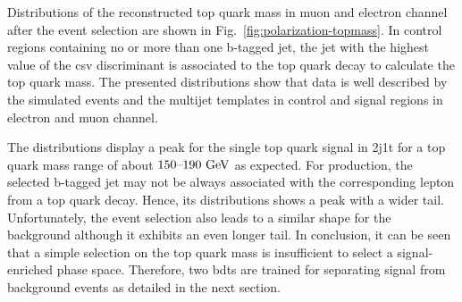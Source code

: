 Distributions of the reconstructed top quark mass in muon and electron channel after the event selection are shown in Fig.~\ref{fig:polarization-topmass}. In control regions containing no or more than one b-tagged jet, the jet with the highest value of the \gls{csv} discriminant is associated to the top quark decay to calculate the top quark mass.  The presented distributions show that data is well described by the simulated events and the multijet templates in control and signal regions in electron and muon channel.

The distributions display a peak for the single top quark signal in 2j1t for a top quark mass range of about $150\text{--}190~\mathrm{GeV}$ as expected. For \ttbar production, the selected b-tagged jet may not be always associated with the corresponding lepton from a top quark decay. Hence, its distributions shows a peak with a wider tail. Unfortunately, the event selection also leads to a similar shape for the \wjets background although it exhibits an even longer tail. In conclusion, it can be seen that a simple selection on the top quark mass is insufficient to select a signal-enriched phase space. Therefore, two \glspl{bdt} are trained for separating signal from background events as detailed in the next section.




